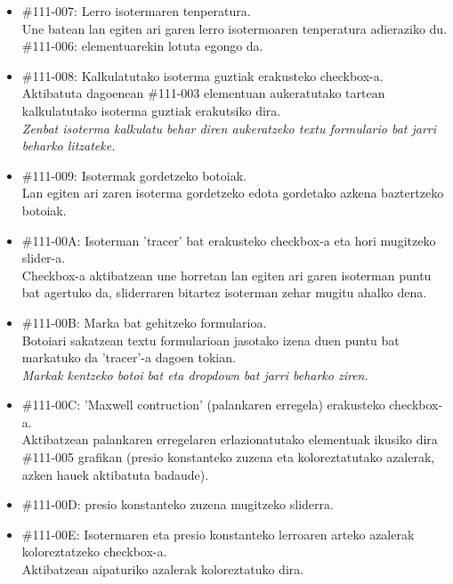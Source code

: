 \documentclass[10pt,a4paper]{article}
\let\nf\normalfont %
\newcommand{\cf}{\normalfont\sffamily}
\begin{document}
\begin{itemize}
\item \cf \#111-007: Lerro isotermaren tenperatura.
\\
\nf Une batean lan egiten ari garen lerro isotermoaren tenperatura adieraziko du. \cf \#111-006: \nf elementuarekin lotuta egongo da.

\item \cf \#111-008: Kalkulatutako isoterma guztiak erakusteko checkbox-a.
\\
\nf Aktibatuta dagoenean \cf \#111-003 \nf elementuan aukeratutako tartean kalkulatutako isoterma guztiak erakutsiko dira.
\\

\textit{Zenbat isoterma kalkulatu behar diren aukeratzeko textu formulario bat jarri beharko litzateke.}

\item \cf \#111-009: Isotermak gordetzeko botoiak.
\\
\nf Lan egiten ari zaren isoterma gordetzeko edota gordetako azkena baztertzeko botoiak.

\item \cf \#111-00A: Isoterman 'tracer' bat erakusteko checkbox-a eta hori mugitzeko slider-a.
\\
\nf Checkbox-a aktibatzean une horretan lan egiten ari garen isoterman puntu bat agertuko da, sliderraren bitartez isoterman zehar mugitu ahalko dena.

\item \cf \#111-00B: Marka bat gehitzeko formularioa.
\\
\nf Botoiari sakatzean textu formularioan jasotako izena duen puntu bat markatuko da 'tracer'-a dagoen tokian.
\\

\textit{Markak kentzeko botoi bat eta dropdown bat jarri beharko ziren.}

\item \cf \#111-00C: 'Maxwell contruction' (palankaren erregela) erakusteko checkbox-a.
\\
\nf Aktibatzean palankaren erregelaren erlazionatutako elementuak ikusiko dira \cf \#111-005 \nf grafikan (presio konstanteko zuzena eta koloreztatutako azalerak, azken hauek aktibatuta badaude).

\item \cf \#111-00D: presio konstanteko zuzena mugitzeko sliderra.
\\
\nf

\item \cf \#111-00E: Isotermaren eta presio konstanteko lerroaren arteko azalerak koloreztatzeko checkbox-a.
\\
\nf Aktibatzean aipaturiko azalerak koloreztatuko dira.


\end{itemize}
\end{document}
